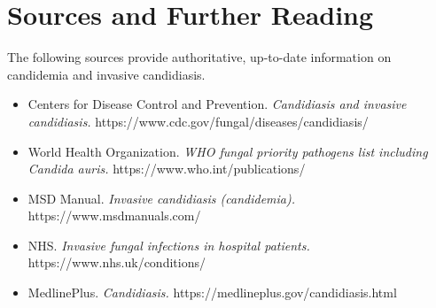 \section*{Sources and Further Reading}
The following sources provide authoritative, up-to-date information on candidemia and invasive candidiasis.
\begin{itemize}
    \item Centers for Disease Control and Prevention. \textit{Candidiasis and invasive candidiasis.} https://www.cdc.gov/fungal/diseases/candidiasis/
    \item World Health Organization. \textit{WHO fungal priority pathogens list including Candida auris.} https://www.who.int/publications/
    \item MSD Manual. \textit{Invasive candidiasis (candidemia).} https://www.msdmanuals.com/
    \item NHS. \textit{Invasive fungal infections in hospital patients.} https://www.nhs.uk/conditions/
    \item MedlinePlus. \textit{Candidiasis.} https://medlineplus.gov/candidiasis.html
\end{itemize}
